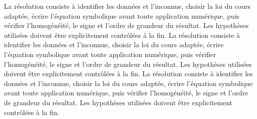 \begin{corrigebox}[Corrigé]
La résolution consiste à identifier les données et l'inconnue, choisir la loi du cours adaptée, écrire l'équation symbolique avant toute application numérique, puis vérifier l'homogénéité, le signe et l'ordre de grandeur du résultat. Les hypothèses utilisées doivent être explicitement contrôlées à la fin.
La résolution consiste à identifier les données et l'inconnue, choisir la loi du cours adaptée, écrire l'équation symbolique avant toute application numérique, puis vérifier l'homogénéité, le signe et l'ordre de grandeur du résultat. Les hypothèses utilisées doivent être explicitement contrôlées à la fin.
La résolution consiste à identifier les données et l'inconnue, choisir la loi du cours adaptée, écrire l'équation symbolique avant toute application numérique, puis vérifier l'homogénéité, le signe et l'ordre de grandeur du résultat. Les hypothèses utilisées doivent être explicitement contrôlées à la fin.
\end{corrigebox}
